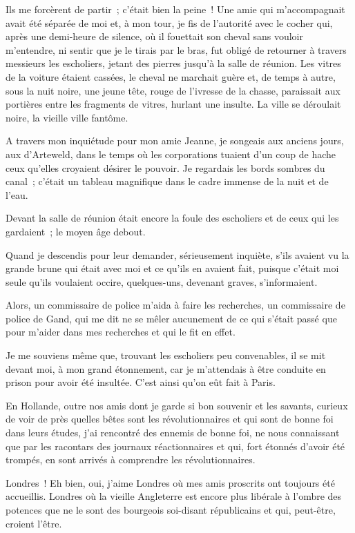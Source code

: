 \documentclass[french,twoside]{book} %
\begin{document}
Ils me forcèrent de partir ; c’était bien la peine ! Une amie qui m’accompagnait avait été séparée de moi et, à mon tour, je fis de l’autorité avec le cocher qui, après une demi-heure de silence, où il fouettait son cheval sans vouloir m’entendre, ni sentir que je le tirais par le bras, fut obligé de retourner à travers messieurs les escholiers, jetant des pierres jusqu’à la salle de réunion. Les vitres de la voiture étaient cassées, le cheval ne marchait guère et, de temps à autre, sous la nuit noire, une jeune tête, rouge de l’ivresse de la chasse, paraissait aux portières entre les fragments de vitres, hurlant une insulte. La ville se déroulait noire, la vieille ville fantôme.\par
A travers mon inquiétude pour mon amie Jeanne, je songeais aux anciens jours, aux d’Arteweld, dans le temps où les corporations tuaient d’un coup de hache ceux qu’elles croyaient désirer le pouvoir. Je regardais les bords sombres du canal ; c’était un tableau magnifique dans le cadre immense de la nuit et de l’eau.\par
Devant la salle de réunion était encore la foule  des escholiers et de ceux qui les gardaient ; le moyen âge debout.\par
Quand je descendis pour leur demander, sérieusement inquiète, s’ils avaient vu la grande brune qui était avec moi et ce qu’ils en avaient fait, puisque c’était moi seule qu’ils voulaient occire, quelques-uns, devenant graves, s’informaient.\par
Alors, un commissaire de police m’aida à faire les recherches, un commissaire de police de Gand, qui me dit ne se mêler aucunement de ce qui s’était passé que pour m’aider dans mes recherches et qui le fit en effet.\par
Je me souviens même que, trouvant les escholiers peu convenables, il se mit devant moi, à mon grand étonnement, car je m’attendais à être conduite en prison pour avoir été insultée. C’est ainsi qu’on eût fait à Paris.\par
En Hollande, outre nos amis dont je garde si bon souvenir et les savants, curieux de voir de près quelles bêtes sont les révolutionnaires et qui sont de bonne foi dans leurs études, j’ai rencontré des ennemis de bonne foi, ne nous connaissant que par les racontars des journaux réactionnaires et qui, fort étonnés d’avoir été trompés, en sont arrivés à comprendre les révolutionnaires.\par
 Londres ! Eh bien, oui, j’aime Londres où mes amis proscrits ont toujours été accueillis. Londres où la vieille Angleterre est encore plus libérale à l’ombre des potences que ne le sont des bourgeois soi-disant républicains et qui, peut-être, croient l’être.\par
\end{document}
